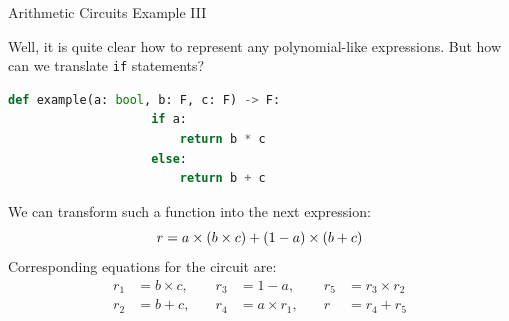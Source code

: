 \documentclass{beamer}
\begin{document}
    \begin{frame}[fragile]{Arithmetic Circuits Example III}
        \begin{example}
            Well, it is quite clear how to represent any polynomial-like expressions. But how can we
            translate \texttt{if} statements?
            \begin{lstlisting}[language=Python, numbers=none, autogobble=true, xleftmargin=8pt]
                def example(a: bool, b: F, c: F) -> F:
                    if a:
                        return b * c 
                    else:
                        return b + c
            \end{lstlisting}
            \pause
            We can transform such a function into the next expression:
            \vspace{-8pt}
            \begin{equation*}
                r = a \times (b \times c) + (1 - a) \times (b + c)    
                \vspace{-8pt}
            \end{equation*}
            \pause
            Corresponding equations for the circuit are:
            \vspace{-8pt}
            \begin{equation*}
                \begin{aligned}
                    r_1 &= b \times c, \quad &r_3 &= 1 - a, \quad &r_5 &= r_3 \times r_2 \\
                    r_2 &= b + c, \quad &r_4 &= a \times r_1, \quad &r &= r_4 + r_5
                \end{aligned}
            \end{equation*}
        \end{example}
    \end{frame}
\end{document}
